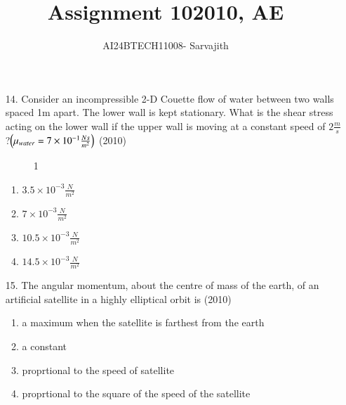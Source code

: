 \documentclass[journal]{IEEEtran}
\begin{document}

\vspace{3cm}


\author{AI24BTECH11008- Sarvajith
}
\title{Assignment 10}
{\let\newpage\relax\maketitle}
\title{2010, AE}
\renewcommand{\thefigure}{\theenumi}
\renewcommand{\thetable}{\theenumi}
\setlength{\intextsep}{10pt} %
\renewcommand{\thetable}{\theenumi}
\begin{enumerate}
 \item[14.] Consider an incompressible 2-D Couette flow of water between two walls spaced 1m apart. The lower wall is kept stationary. What is the shear stress acting on the lower wall if the upper wall is moving at a constant speed of $2\frac{m}{s}$?$\left(\mu_{water}=7\times 10^{-1}\frac{Ns}{m^2}\right)$ \hfill (2010)
 \begin{figure}[!ht]
    \centering
    \caption{1}
    \label{fig:1}
\end{figure}
 \begin{enumerate}[label=(\Alph*)]
    \item $3.5\times 10^{-3}\frac{N}{m^2}$
    \item $7\times 10^{-3}\frac{N}{m^2}$
    \item $10.5\times 10^{-3}\frac{N}{m^2}$
    \item $14.5\times 10^{-3}\frac{N}{m^2}$
 \end{enumerate}
 \item[15.] The angular momentum, about the centre of mass of the earth, of an artificial satellite in a highly elliptical orbit is \hfill (2010)
 \begin{enumerate}[label=(\Alph*)]
    \item a maximum when the satellite is farthest from the earth
    \item a constant
    \item proprtional to the speed of satellite
    \item proprtional to the square of the speed of the satellite
 \end{enumerate}

\end{enumerate}
\end{document}
